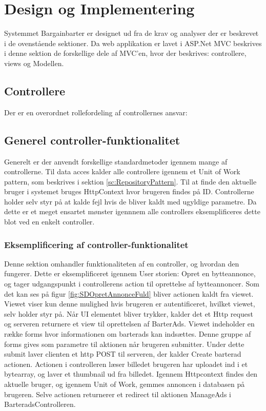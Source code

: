 \chapter{Design og Implementering}
Systemmet Bargainbarter er designet ud fra de krav og analyser der er beskrevet i de ovenstående sektioner. Da web applikation er lavet i ASP.Net MVC beskrives i denne sektion de forskellige dele af MVC'en, hvor der beskrives: controllere, views og Modellen. 


\section{Controllere}
Der er en overordnet rollefordeling af controllernes ansvar: 



\section{Generel controller-funktionalitet}

Generelt er der anvendt forskellige standardmetoder igennem mange af controllerne. Til data acces kalder alle controllere igennem et Unit of Work pattern, som beskrives i sektion \ref{sc:RepositoryPattern}. Til at finde den aktuelle bruger i systemet bruges HttpContext hvor brugeren findes på ID. Controllerne holder selv styr på at kalde fejl hvis de bliver kaldt med ugyldige parametre. Da dette er et meget ensartet mønster igennnem alle controllers eksemplificeres dette blot ved en enkelt controller.

\subsection{Eksemplificering af controller-funktionalitet}
Denne sektion omhandler funktionaliteten af en controller, og hvordan den fungerer. Dette er eksemplificeret igennem User storien: Opret en bytteannonce, og tager udgangspunkt i controllerens action til oprettelse af bytteannoncer.
Som det kan ses på figur \ref{fig:SDOpretAnnonceFuld} bliver actionen kaldt fra viewet. Viewet viser kun denne mulighed hvis brugeren er autentificeret, hvilket viewet, selv holder styr på. Når UI elementet bliver trykker, kalder det et Http request og serveren returnere et view til oprettelsen af BarterAds. Viewet indeholder en række forms hvor informationen om barterads kan indsættes. Denne gruppe af forms gives som parametre til aktionen når brugeren submitter. Under dette submit laver clienten et http POST til serveren, der kalder Create barterad actionen. Actionen i controlleren læser billedet brugeren har uploadet ind i et bytearray, og laver et thumbnail ud fra billedet. Igennem Httpcontext findes den aktuelle bruger, og igennem Unit of Work, gemmes annoncen i databasen på brugeren. Selve actionen returnerer et redirect til aktionen ManageAds i BarteradsControlleren. 


